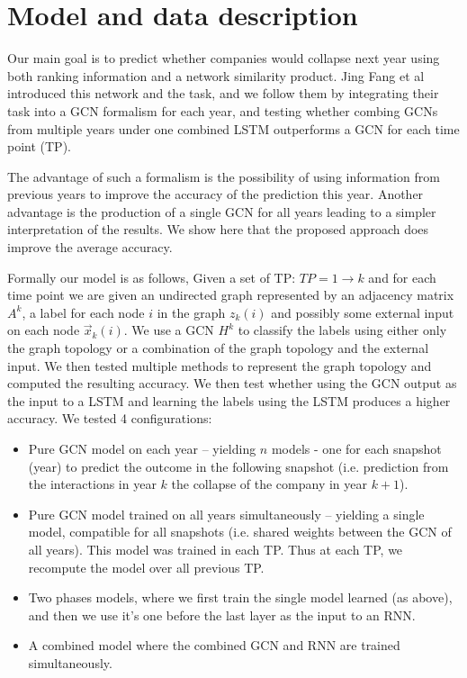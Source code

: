 \section{Model and data description}
Our main goal is to predict whether companies would collapse next year using both ranking information and a network similarity product. Jing Fang et al \cite{fan2018combined} introduced this network and the task, and we follow them by integrating their task into a GCN formalism for each year, and testing whether combing GCNs from multiple years under one combined LSTM outperforms a GCN for each time point (TP).

The advantage of such a formalism is the possibility of using information from previous years to improve the accuracy of the prediction this year. Another advantage is the production of a single GCN for all years leading to a simpler interpretation of the results. We show here that the proposed approach does improve the average accuracy. 

Formally our model is as follows, Given a set of TP: $TP=1 \to k$ and for each time point we are given an undirected graph represented by an adjacency matrix $A^k$, a label for each node $i$ in the graph $z_{k}(i)$ and possibly some external input on each node $\vec{x}_{k}(i)$. We use a GCN $H^k$ to classify the labels using either only the graph topology or a combination of the graph topology and the external input. We then tested multiple methods to represent the graph topology and computed the resulting accuracy. We then test whether using the GCN output as the input to a LSTM and learning the labels using the LSTM produces a higher accuracy. We tested 4 configurations:
\begin{itemize}
\item   Pure GCN model on each year – yielding $n$ models - one for each snapshot (year) to predict the outcome in the following snapshot (i.e. prediction from the interactions in year $k$ the collapse of the company in year $k+1$).
\item   Pure GCN model trained on all years simultaneously – yielding a single model, compatible for all snapshots (i.e. shared weights between the GCN of all years). This model was trained in each TP. Thus at each TP, we recompute the model over all previous TP.
\item   Two phases models, where we first train the single model learned (as above), and then we use it’s one before the last layer as the input to an RNN.
\item   A combined model where the combined GCN and RNN are trained simultaneously.
\end{itemize}


